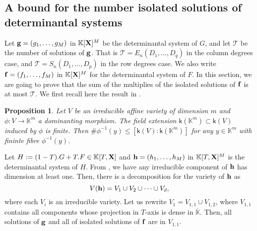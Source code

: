 \documentclass[11pt]{article}
\numberwithin{Property}{section}
\numberwithin{Theorem}{section}
\newtheorem{Proposition}{Proposition}%
\numberwithin{Proposition}{section}
\numberwithin{Lemma}{section}
\numberwithin{Corollary}{section}
\numberwithin{Definition}{section}
\numberwithin{Remark}{section}
\numberwithin{Conjecture}{section}
\numberwithin{Problem}{section}
\numberwithin{Claim}{section}
\theoremstyle{definition}
\numberwithin{Example}{section}
\renewcommand{\leq}{\leqslant}
\def\bar{\overline}
\newcommand{\field}{\mathbb{K}} %
\newcommand{\mat}[1]{\mathbf{\MakeUppercase{#1}}} %
\begin{document}
\subsection{A bound for the number isolated solutions of determinantal systems}
\label{subsec:bounddegree}
Let ${\bf g} = (g_1, \ldots, g_M)$ in $\field[\mat{X}]^M$ be the determinantal system of $G$, and let $\mathcal{T}$ be the number of solutions of ${\bf g}$. That is $\mathcal{T} = E_{n}(D_1, \ldots, D_q)$ in the column degrees case, and $\mathcal{T} = S_{n}(D_1, \ldots, D_p)$ in the row degrees case. We also write ${\bf f} = (f_1, \ldots, f_M)$ in $\field[\mat{X}]^M$ for the determinantal system of $F$. In this section, we are going to prove that the sum of the multiplies of the isolated solutions of ${\bf f}$ is at most $\mathcal{T}$. We first recall here the result in \cite[Proposition~1]{Hen83}. 
\begin{Proposition}\label{hen} Let $V$ be an irreducible affine variety of dimension $m$ and $\phi: V \to \field^m$ a dominanting morphism. The field extension $\mathsf{k}(\field^m) \subset \mathsf{k}(V)$ induced by $\phi$ is finite. Then $\#\phi^{-1}(y) \leq [ \mathsf{k}(V) : \mathsf{k}(\field^m)]$ for any $y \in \field^m$ with fininte fibre $\phi^{-1}(y)$.
\end{Proposition}

Let $H := (1-T).G + T.F \in \field[T, \mat{X}]$ and ${\bf h} = (h_1, \ldots, h_M)$ in $\field[T, \mat{X}]^M$ is the determinantal system of $H$. From \cite[Section~6]{Eagon188}, we have any irreducible component of ${\bf h}$ has dimension at least one. Then, there is a decomposition for the variety of ${\bf h}$ as 
\[
V({\bf h}) = V_1 \cup V_2 \cup \cdots \cup V_d, \] where each $V_i$
is an irreducible variety. Let us rewrite $V_1 = V_{1,1} \cup V_{1,2}$, where $V_{1,1}$ contains all components whose projection in $T$-axis is dense in $\bar{\field}$. Then, all solutions of ${\bf g}$ and all of isolated solutions of ${\bf f}$ are in $V_{1,1}$. 
\end{document}
